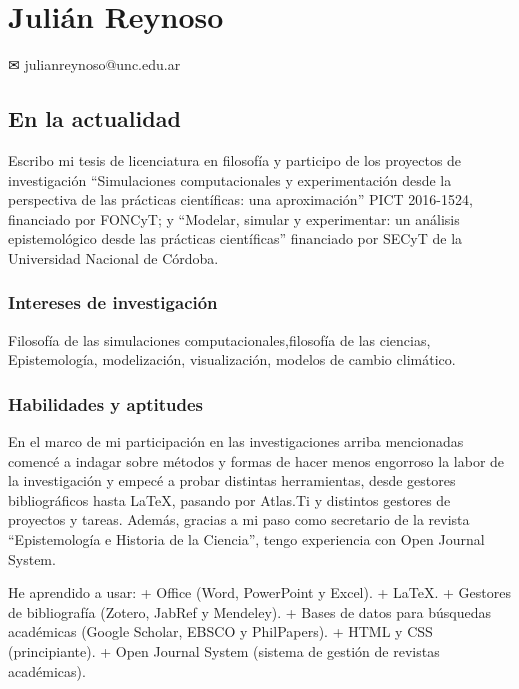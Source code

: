 \documentclass[]{article}
\date{}
\begin{document}
\hypertarget{juliuxe1n-reynoso}{%
\section{Julián Reynoso}\label{juliuxe1n-reynoso}}

\leavevmode\hypertarget{webaddress}{}%
✉ julianreynoso@unc.edu.ar

\hypertarget{en-la-actualidad}{%
\subsection{En la actualidad}\label{en-la-actualidad}}

Escribo mi tesis de licenciatura en filosofía y participo de los
proyectos de investigación ``Simulaciones computacionales y
experimentación desde la perspectiva de las prácticas científicas: una
aproximación'' PICT 2016-1524, financiado por FONCyT; y ``Modelar,
simular y experimentar: un análisis epistemológico desde las prácticas
científicas'' financiado por SECyT de la Universidad Nacional de
Córdoba.

\hypertarget{intereses-de-investigaciuxf3n}{%
\subsubsection{Intereses de
investigación}\label{intereses-de-investigaciuxf3n}}

Filosofía de las simulaciones computacionales,filosofía de las ciencias,
Epistemología, modelización, visualización, modelos de cambio climático.

\hypertarget{habilidades-y-aptitudes}{%
\subsubsection{Habilidades y aptitudes}\label{habilidades-y-aptitudes}}

En el marco de mi participación en las investigaciones arriba
mencionadas comencé a indagar sobre métodos y formas de hacer menos
engorroso la labor de la investigación y empecé a probar distintas
herramientas, desde gestores bibliográficos hasta LaTeX, pasando por
Atlas.Ti y distintos gestores de proyectos y tareas. Además, gracias a
mi paso como secretario de la revista ``Epistemología e Historia de la
Ciencia'', tengo experiencia con Open Journal System.

He aprendido a usar: + Office (Word, PowerPoint y Excel). + LaTeX. +
Gestores de bibliografía (Zotero, JabRef y Mendeley). + Bases de datos
para búsquedas académicas (Google Scholar, EBSCO y PhilPapers). + HTML y
CSS (principiante). + Open Journal System (sistema de gestión de
revistas académicas).
\end{document}
